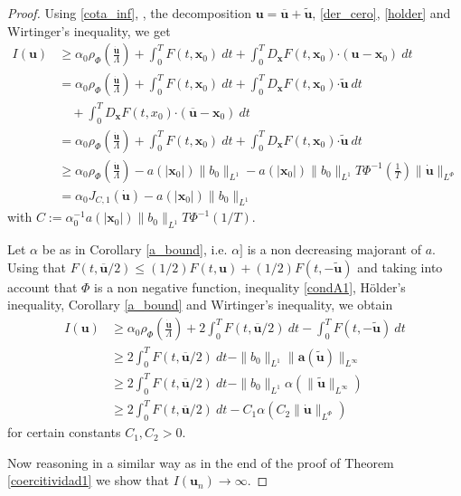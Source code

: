 \documentclass[twoside]{article}
\theoremstyle{remark}
\newcommand{\orlnor}{\|_{L^{\Phi}}}
\newcommand{\lphi}{L^{\Phi}}
\renewcommand{\b}[1]{\boldsymbol{#1}}
\newcommand{\ccdot}{\b{\cdot}}
\renewcommand{\leq}{\leqslant}
\begin{document}
\begin{proof}  Using \eqref{cota_inf}, \cite[Eq. (18), p.17]{mawhin2010critical},  the decomposition $\b{u}=\b{\overline{u}}+\b{\tilde{u}}$,  \eqref{der_cero}, \eqref{holder} and Wirtinger's inequality, we get
%
\begin{equation}\label{cota_con _upunto}
\begin{split}
I(\b{u})&\geq\alpha_0\rho_{\Phi}\left( \frac{\b{\dot{u}}}{\Lambda}\right)+\int_0^T F(t,\b{x}_0)\ dt 
+ \int_0^T D_{\b{x}} F (t,\b{x}_0) \ccdot (\b{u}-\b{x}_0)\ dt\\
&=\alpha_0\rho_{\Phi}\left( \frac{\b{\dot{u}}}{\Lambda}\right) +\int_0^T F(t,\b{x}_0)\ dt 
+ \int_0^TD_{\b{x}}F (t,\b{x}_0) \ccdot \b{\widetilde{u}} \ dt\\
&\quad + \int_0^T D_{\b{x}} F (t,x_0) \ccdot (\b{\overline{u}}  -\b{x}_0) \ dt\\
&=\alpha_0\rho_{\Phi}\left( \frac{\b{\dot{u}}}{\Lambda}\right)+\int_0^T F(t,\b{x}_0)\ dt + 
\int_0^T D_{\b{x}} F (t,\b{x}_0) \ccdot \b{\widetilde{u}}\ dt\\
&\geq\alpha_0 \rho_{\Phi}\left( \frac{\b{\dot{u}}}{\Lambda}\right)-a(|\b{x}_0|)\|b_0\|_{L^1} 
-a(|\b{x}_0|)\|b_0\|_{L^1}T\Phi^{-1}\left(\frac{1}{T}\right) \|\b{\dot{u}}  \|_{\lphi}\\
&= \alpha_0 J_{C,1}(\b{\dot{u}})-a(|\b{x}_0|)\|b_0\|_{L^1} 
\end{split}
\end{equation}
with $C:=\alpha_0^{-1}a(|\b{x}_0|)\|b_0\|_{L^1}T\Phi^{-1}(1/T)$. 

Let $\alpha$ be as in Corollary \ref{a_bound}, i.e. $\alpha]$ is  a non decreasing majorant of $a$. Using that  $F(t, \b{\overline{u}} /2) \leq (1/2)F(t,\b{u}) + (1/2) F(t, -\b{\widetilde{u}})$ and taking into account that $\Phi$ is a non negative function, inequality \eqref{condA1}, H\"older's inequality,  Corollary \ref{a_bound} and Wirtinger's inequality, we obtain
\begin{equation}\label{cota_con _ubarra}
\begin{split}
I(\b{u}) &\geq\alpha_0\rho_{\Phi}\left( \frac{\b{\dot{u}}}{\Lambda}\right)  +2 \int_0^T F(t,\b{\overline{u}} /2)\ dt - \int_0^T F(t, -\b{\widetilde{u}})\ dt\\
&\geq 2 \int_0^T F(t,\b{\overline{u}} /2)\ dt -\|b_0\|_{L^1} \|\b{a}(\b{\tilde{u}})\|_{L^{\infty}}\\
&\geq 2 \int_0^T F(t,\b{\overline{u}} /2)\ dt -\|b_0\|_{L^1} \alpha(\|\b{\tilde{u}}\|_{L^{\infty}})\\
&\geq 2 \int_0^T F(t,\b{\overline{u}} /2)\  dt - C_1 \alpha(C_2\|\b{\dot{u}}\orlnor)
\end{split}
\end{equation}
for certain constants $C_1,C_2>0$.


Now reasoning in a similar way as  in the end of  the proof of Theorem \ref{coercitividad1} we show that  $I(\b{u}_n)\to\infty$. 
\end{proof}
\end{document}
